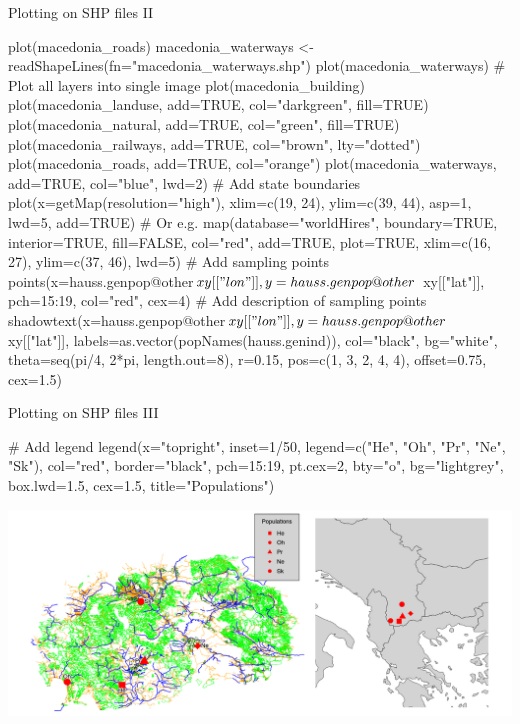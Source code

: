 \documentclass[compress, ucs, xelatex, 11pt, xcolor=svgnames,
  hyperref={
    bookmarks=true,
    unicode=true,
    colorlinks=true,
    pdftitle={Molecular data in R},
    plainpages=false,
    pdfauthor={Vojtech Zeisek},
    pdfsubject={Course about phylogeny and evolution in R},
    pdfcreator={XeLaTeX},
    pdfkeywords={R, evolution, phylogeny, molecular data},
    linkcolor=Tomato,
    anchorcolor=SaddleBrown,
    citecolor=Goldenrod,
    filecolor=DarkMagenta,
    menucolor=Sienna,
    urlcolor=DarkTurquoise,
    pdftex},
  url={hyphens, lowtilde} %
  ]{beamer}
\begin{document}
\begin{frame}[fragile]{Plotting on SHP files II} %
  \begin{spluscode}
    plot(macedonia_roads)
    macedonia_waterways <- readShapeLines(fn="macedonia_waterways.shp")
    plot(macedonia_waterways)
    # Plot all layers into single image
    plot(macedonia_building)
    plot(macedonia_landuse, add=TRUE, col="darkgreen", fill=TRUE)
    plot(macedonia_natural, add=TRUE, col="green", fill=TRUE)
    plot(macedonia_railways, add=TRUE, col="brown", lty="dotted")
    plot(macedonia_roads, add=TRUE, col="orange")
    plot(macedonia_waterways, add=TRUE, col="blue", lwd=2)
    # Add state boundaries
    plot(x=getMap(resolution="high"), xlim=c(19, 24), ylim=c(39, 44), asp=1,
      lwd=5, add=TRUE) # Or e.g.
    map(database="worldHires", boundary=TRUE, interior=TRUE, fill=FALSE,
      col="red", add=TRUE, plot=TRUE, xlim=c(16, 27), ylim=c(37, 46), lwd=5)
    # Add sampling points
    points(x=hauss.genpop@other$xy[["lon"]], y=hauss.genpop@other$
      xy[["lat"]], pch=15:19, col="red", cex=4)
    # Add description of sampling points
    shadowtext(x=hauss.genpop@other$xy[["lon"]], y=hauss.genpop@other$
      xy[["lat"]], labels=as.vector(popNames(hauss.genind)), col="black",
      bg="white", theta=seq(pi/4, 2*pi, length.out=8), r=0.15,
      pos=c(1, 3, 2, 4, 4), offset=0.75, cex=1.5)
  \end{spluscode}
\end{frame}

\begin{frame}[fragile]{Plotting on SHP files III} %
  \vfil
  \begin{spluscode}
    # Add legend
    legend(x="topright", inset=1/50, legend=c("He", "Oh", "Pr", "Ne",
      "Sk"), col="red", border="black", pch=15:19, pt.cex=2, bty="o",
      bg="lightgrey", box.lwd=1.5, cex=1.5, title="Populations")
  \end{spluscode}
  \vfill
  \includegraphics[width=\textwidth]{mapy.png}
\end{frame}
\end{document}
